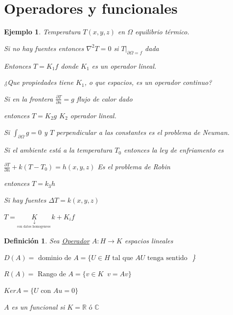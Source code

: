 \documentclass[a4paper,10pt]{book}
\newtheorem{ejemplo}{Ejemplo}
\newtheorem{definition}{Definición}
\begin{document}
\section{Operadores y funcionales}

\begin{ejemplo}
    Temperatura $T(x,y,z)$  en $\Omega$ equilibrio térmico. 
    
    Si no hay fuentes entonces $\nabla^2 T= 0$ si $T|_{\partial \Omega = f }$ dada
    
    Entonces $T= K_1 f$ donde $K_1$ es un operador lineal. 
    
    ¿Que propiedades tiene $K_1$, o que espacios, es un operador continuo? 

    Si en la frontera $\frac{\partial T}{ \partial n} =  g$  flujo de calor dado
    
    entonces $T=K_2 g $  $K_2$ operador lineal. 
    
    Si $\int_{\partial \Omega} g = 0$ y
    $T$ perpendicular a las constantes es el problema de Neuman. 

    Si el ambiente está a la temperatura $T_0$ entonces la ley de enfriamento es

    $\frac{\partial T }{ \partial n } + k (T-T_0) = h(x,y,z) $ Es el problema de Robin

    entonces $T= k_3 h$

    Si hay fuentes $\Delta T = k(x,y,z)$  

    $T= \underset{\underset{\text{con datos homogeneos }}{\downarrow}}{K} k + K_i f$
\end{ejemplo}


\begin{definition}
 Sea \underline{Operador}  $A: H \rightarrow K$  espacios lineales

 $D(A)= \text{ dominio de } A = \{ U\in H \text{ tal que } AU \text{ tenga sentido }$ \}

 $R(A) = \text{ Rango de } A = \{ v \in  K \;\; v= A v\}$ 

 $Ker A= \{  U \text{ con } Au=0\}$

 $A$ es un funcional si $K= \mathbb{R} \text{ ó } \mathbb{C}$  
\end{definition}
\end{document}
